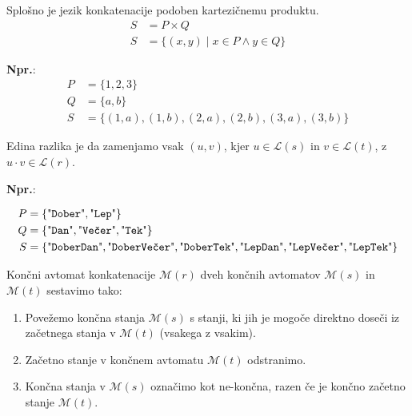 \documentclass{article}
\newcommand{\Ex}{\textbf{Npr.}:\ }
\newcommand{\Language}[1]{\mathcal{L}(#1)}
\newcommand{\Automaton}[1]{\mathcal{M}(#1)}
\newcommand{\Str}[1]{\text{\textquotedbl\texttt{#1}\textquotedbl}}
\newcommand{\Seq}{\cdot}
\begin{document}
Splošno je jezik konkatenacije podoben kartezičnemu produktu.
\begin{align*}
  S &= P \times Q \\
  S &= \{ (x, y) \mid x \in P \land y \in Q\}
\end{align*}

\Ex
\begin{align*}
  P &= \{1, 2, 3\}\\
  Q &= \{a, b\}\\
  S &= \{(1, a), (1, b), (2, a), (2, b), (3, a), (3, b) \}
\end{align*}

Edina razlika je da zamenjamo vsak $(u, v)$, kjer $u \in \Language{s}$ in $v\in \Language{t}$, z $u \Seq v \in \Language{r}$.

\Ex

\begin{align*}
  P &= \{\Str{Dober}, \Str{Lep}\}\\
  Q &= \{\Str{Dan}, \Str{Večer}, \Str{Tek}\}\\
  S &= \{\Str{DoberDan}, \Str{DoberVečer}, \Str{DoberTek}, \Str{LepDan}, \Str{LepVečer}, \Str{LepTek} \}
\end{align*}

Končni avtomat konkatenacije $\Automaton{r}$ dveh končnih avtomatov $\Automaton{s}$ in $\Automaton{t}$ sestavimo tako:
\begin{enumerate}
\item Povežemo končna stanja $\Automaton{s}$ s stanji, ki jih je mogoče direktno doseči iz začetnega stanja v $\Automaton{t}$ (vsakega z vsakim).
\item Začetno stanje v končnem avtomatu $\Automaton{t}$ odstranimo.
\item Končna stanja v $\Automaton{s}$ označimo kot ne-končna, razen če je končno začetno stanje $\Automaton{t}$.
\end{enumerate}
\end{document}
